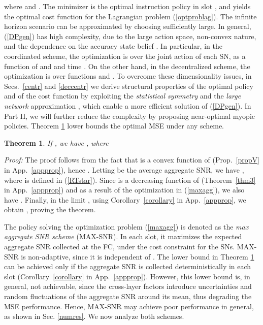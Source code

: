 \documentclass[10pt,twocolumn,twoside]{IEEEtran}
\newtheorem{thm}{Theorem}
\theoremstyle{plain}
\begin{document}
where  and .
The minimizer is the optimal instruction policy  in slot ,
and  yields the optimal cost function for the Lagrangian problem (\ref{optproblag}).
The infinite horizon scenario  can be approximated by choosing  sufficiently large.
In general, (\ref{DPgen}) has high complexity, due to the large action space, non-convex nature, and the dependence on the accuracy state belief 
.
In particular, in the coordinated scheme, the optimization is over the joint action 
of each SN, as a function of  and  and time .
On the other hand, in the decentralized scheme, the optimization is over functions
 and .
To overcome these dimensionality issues,
in Secs.~\ref{centr} and \ref{deccentr} we derive structural properties of the optimal policy and of the cost function by exploiting the \emph{statistical symmetry}
 and the \emph{large network} approximation ,
which enable a more efficient solution of (\ref{DPgen}). In Part II, we will further reduce the complexity by proposing
 near-optimal myopic policies.
Theorem \ref{lowbound} lower bounds the optimal MSE under any scheme.
\begin{thm}
\label{lowbound}
If , we have
,
where

\end{thm}
\noindent\emph{Proof:}
The proof follows from the fact that  is a convex function of  (Prop.~\ref{propV} in App.~\ref{appprop}),
hence . 
Letting  be the average aggregate SNR, we have 
,
where  is defined in (\ref{RTstar}). Since  is a decreasing function of  (Theorem~\ref{thm3} in App.~\ref{appprop}) and 
 as a result of the optimization in (\ref{maxagg}),
we also have . Finally, in the limit , using Corollary~\ref{corollary} in App.~\ref{appprop},
we obtain , proving the theorem.\hfill\QED


The policy solving the optimization problem (\ref{maxagg}) is denoted as the \emph{max aggregate SNR scheme} (MAX-SNR). In each slot, it maximizes the expected 
aggregate SNR collected at the FC, under the cost constraint for the SNs.
MAX-SNR is non-adaptive, since it is independent of .
The lower bound in Theorem \ref{lowbound} can be achieved only if the aggregate SNR  is collected deterministically in each slot
 (Corollary~\ref{corollary} in App.~\ref{appprop}).
However, this lower bound is, in general, not achievable, 
since the cross-layer factors introduce uncertainties and random fluctuations of the aggregate SNR  around its mean, thus
degrading the MSE performance. Hence, MAX-SNR may achieve poor performance in general, as shown in Sec. \ref{numres}.
We now analyze both schemes.
\vspace{-3mm}
\end{document}
